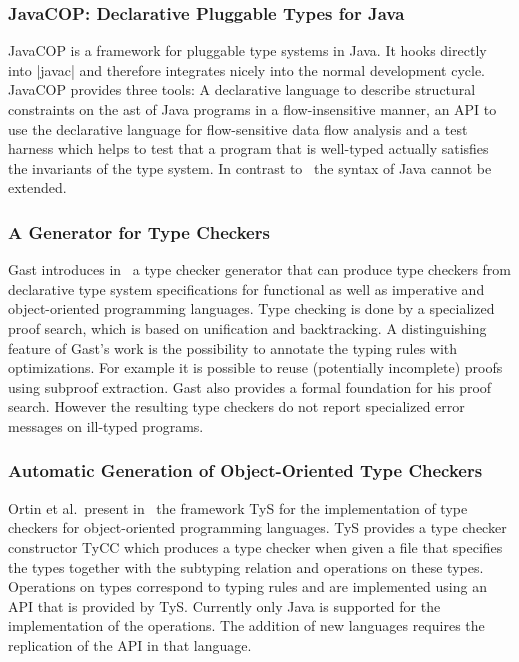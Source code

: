 \subsubsection{JavaCOP: Declarative Pluggable Types for Java}
JavaCOP \cite{Markstrum:2010:JDP:1667048.1667049} is a framework for
pluggable type systems in Java. It hooks directly into \code|javac|
and therefore integrates nicely into the normal development
cycle. JavaCOP provides three tools: A declarative language to
describe structural constraints on the \gls{ast} of Java programs in a
flow-insensitive manner, an API to use the declarative language for
flow-sensitive data flow analysis and a test harness which helps to
test that a program that is well-typed actually satisfies the
invariants of the type system. In contrast to~\cite{bergan2007typmix}
the syntax of Java cannot be extended.


\subsubsection{A Generator for Type Checkers}
Gast introduces in~\cite{gast2005generator} a type checker generator
that can produce type checkers from declarative type system
specifications for functional as well as imperative and
object-oriented programming languages. Type checking is done by a
specialized proof search, which is based on unification and
backtracking. A distinguishing feature of Gast's work is the
possibility to annotate the typing rules with optimizations. For
example it is possible to reuse (potentially incomplete) proofs using
subproof extraction. Gast also provides a formal foundation for his
proof search. However the resulting type checkers do not report
specialized error messages on ill-typed programs.

\subsubsection{Automatic Generation of Object-Oriented Type Checkers}
Ortin et al.\ present in~\cite{ortin2014automatic} the framework TyS
for the implementation of type checkers for object-oriented
programming languages. TyS provides a type checker constructor TyCC
which produces a type checker when given a file that specifies the
types together with the subtyping relation and operations on these
types. Operations on types correspond to typing rules and are
implemented using an API that is provided by TyS. Currently only Java
is supported for the implementation of the operations. The addition of
new languages requires the replication of the API in that language.

